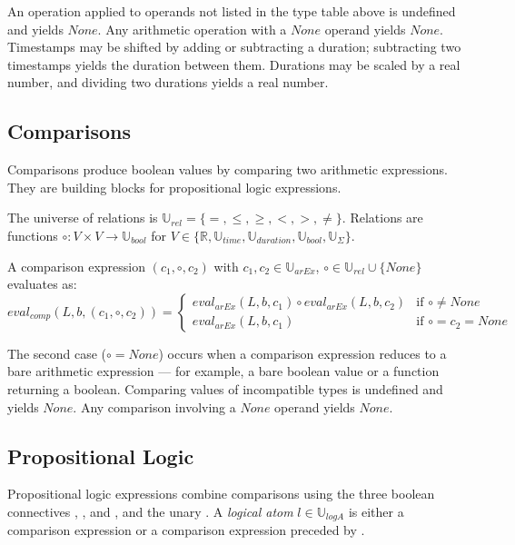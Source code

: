 An operation applied to operands not listed in the type table above is undefined and yields $None$. Any arithmetic operation with a $None$ operand yields $None$. Timestamps may be shifted by adding or subtracting a duration; subtracting two timestamps yields the duration between them. Durations may be scaled by a real number, and dividing two durations yields a real number.

\subsection{Comparisons}

Comparisons produce boolean values by comparing two arithmetic expressions. They are building blocks for propositional logic expressions.

\begin{frameddef}[Comparisons]
The universe of relations is $\mathbb{U}_{rel} = \{ =, \leq, \geq, <, >, \neq \}$. Relations are functions $\circ : V \times V \to \mathbb{U}_{bool}$ for $V \in \{ \mathbb{R}, \mathbb{U}_{time}, \mathbb{U}_{duration}, \mathbb{U}_{bool}, \mathbb{U}_\Sigma \}$.

A comparison expression $(c_1, \circ, c_2)$ with $c_1, c_2 \in \mathbb{U}_{arEx}$, $\circ \in \mathbb{U}_{rel} \cup \{ None \}$ evaluates as:
\[
eval_{comp}(L, b, (c_1, \circ, c_2)) = \begin{cases}
eval_{arEx}(L, b, c_1) \circ eval_{arEx}(L, b, c_2) & \text{if } \circ \neq None \\
eval_{arEx}(L, b, c_1) & \text{if } \circ = c_2 = None
\end{cases}
\]
\end{frameddef}

The second case ($\circ = None$) occurs when a comparison expression reduces to a bare arithmetic expression — for example, a bare boolean value or a function returning a boolean. Comparing values of incompatible types is undefined and yields $None$. Any comparison involving a $None$ operand yields $None$.

\subsection{Propositional Logic}

Propositional logic expressions combine comparisons using the three boolean connectives , , and , and the unary . A \emph{logical atom} $l \in \mathbb{U}_{logA}$ is either a comparison expression or a comparison expression preceded by .

